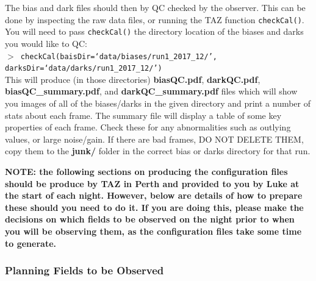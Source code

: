 \documentclass[12pt]{article}
\begin{document}
The bias and dark files should then by QC checked by the observer. This can be done by inspecting the raw data files, or running the TAZ function \texttt{checkCal()}. You will need to pass \texttt{checkCal()} the directory location of the biases and darks you would like to QC:\\

 \texttt{$>$ checkCal(baisDir=`data/biases/run1\_2017\_12/', \\ darksDir=`data/darks/run1\_2017\_12/')} \\
 
This will produce (in those directories) \textbf{biasQC.pdf}, \textbf{darkQC.pdf}, \textbf{biasQC\_summary.pdf}, and \textbf{darkQC\_summary.pdf} files  which will show you images of all of the biases/darks in the given directory and print a number of stats about each frame. The summary file will display a table of some key properties of each frame. Check these for any abnormalities such as outlying values, or large noise/gain. If there are bad frames, DO NOT DELETE THEM,  copy them to the \textbf{junk/} folder in the correct bias or darks directory for that run. 


\textbf{\textcolor{PineGreen}{NOTE: the following sections on producing the configuration files should be produce by TAZ in Perth and provided to you by Luke at the start of each night. However, below are details of how to prepare these should you need to do it. If you are doing this, please make the decisions on which fields to be observed on the night prior to when you will be observing them, as the configuration files take some time to generate. }}


\subsubsection{Planning Fields to be Observed}
\end{document}
